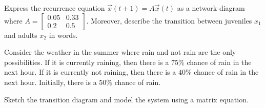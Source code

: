\documentclass[../main.tex]{subfiles}
\begin{document}
\begin{exercise} \label{ex:transition-matrix-to-network}
  Express the recurrence equation \(\vec{x}(t+1) = A \vec{x}(t)\) as a network diagram where \(A = \begin{bmatrix} 0.05 & 0.33 \\ 0.2 & 0.5 \end{bmatrix}\). Moreover, describe the transition between juveniles \(x_{1}\) and adults \(x_{2}\) in words.

  \blanks*
\end{exercise}
\clearpage

\begin{exercise} \label{ex:weather-forecast-model}
  Consider the weather in the summer where rain and not rain are the only possibilities.  If it is currently raining, then there is a \(75\%\) chance of rain in the next hour. If it is currently not raining, then there is a \(40\%\) chance  of rain in the next hour.  Initially, there is a \(50\%\) chance of rain.  

  Sketch the transition diagram and model the system using a matrix equation.

\end{exercise}
\end{document}
